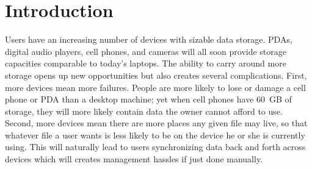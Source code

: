 
\section{Introduction}

%
%

Users have an increasing number of devices with sizable data storage.
PDAs, digital audio players, cell phones, and cameras will all soon
provide storage capacities comparable to today's laptops.  The ability
to carry around more storage opens up new opportunities but also
creates several complications.  First, more devices mean more
failures.  People are more likely to lose or damage a cell phone or
PDA than a desktop machine; yet when cell phones have 60~GB of
storage, they will more likely contain data the owner cannot afford to
use.  Second, more devices mean there are more places any given file
may live, so that whatever file a user wants is less likely to be on
the device he or she is currently using.  This will naturally lead to
users synchronizing data back and forth across devices which will
creates management hassles if just done manually.

